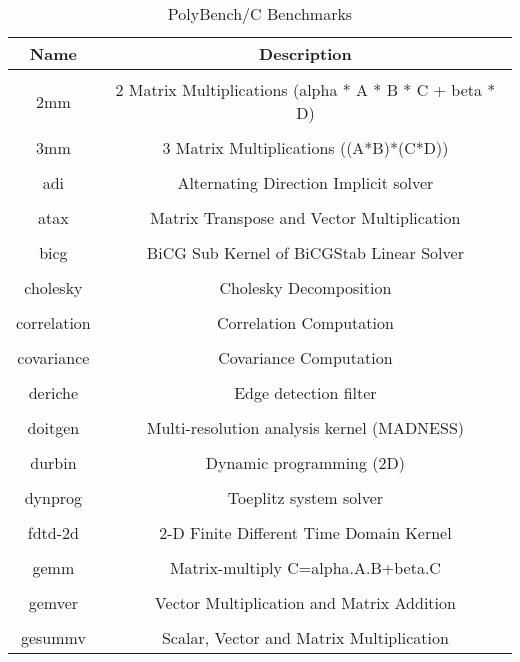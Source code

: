\bigskip
\begin{table}[h!]
\centering
\begin{tabular}{||c c||} 
\hline
Name & Description \\ [1ex] 
\hline\hline
 & \\
2mm & 2 Matrix Multiplications (alpha * A * B * C + beta * D) \\ 
 & \\
3mm & 3 Matrix Multiplications ((A*B)*(C*D)) \\ 
 & \\
adi & Alternating Direction Implicit solver \\ 
 & \\
atax & Matrix Transpose and Vector Multiplication \\ 
 & \\
bicg & BiCG Sub Kernel of BiCGStab Linear Solver \\ 
 & \\
cholesky & Cholesky Decomposition \\ 
 & \\
correlation & Correlation Computation \\ 
 & \\
covariance & Covariance Computation \\ 
 & \\
deriche & Edge detection filter \\ 
 & \\
doitgen & Multi-resolution analysis kernel (MADNESS) \\ 
 & \\
durbin & Dynamic programming (2D) \\ 
 & \\
dynprog & Toeplitz system solver \\ 
 & \\
fdtd-2d & 2-D Finite Different Time Domain Kernel \\ 
 & \\
gemm & Matrix-multiply C=alpha.A.B+beta.C \\ 
 & \\
gemver & Vector Multiplication and Matrix Addition \\ 
 & \\
gesummv & Scalar, Vector and Matrix Multiplication \\ [1ex]
\hline
\end{tabular}
\caption{PolyBench/C Benchmarks}
\label{table:time_complexity_2}
\end{table}

